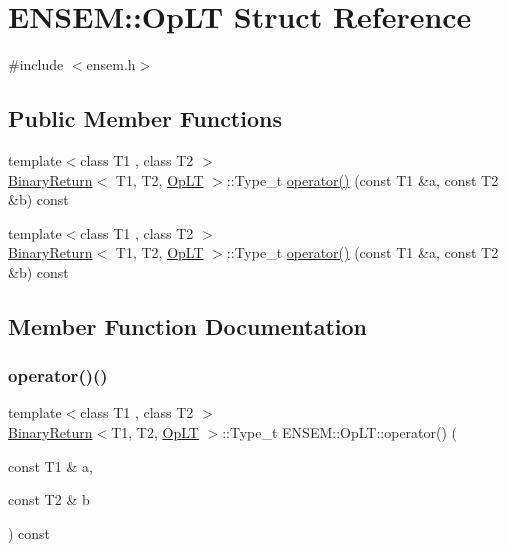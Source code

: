 \hypertarget{structENSEM_1_1OpLT}{}\section{E\+N\+S\+EM\+:\+:Op\+LT Struct Reference}
\label{structENSEM_1_1OpLT}


{\ttfamily \#include $<$ensem.\+h$>$}

\subsection*{Public Member Functions}
\begin{DoxyCompactItemize}
\item 
{\footnotesize template$<$class T1 , class T2 $>$ }\\\mbox{\hyperlink{structENSEM_1_1BinaryReturn}{Binary\+Return}}$<$ T1, T2, \mbox{\hyperlink{structENSEM_1_1OpLT}{Op\+LT}} $>$\+::Type\+\_\+t \mbox{\hyperlink{structENSEM_1_1OpLT_af52d16f9a101e3c95c415857a2da4425}{operator()}} (const T1 \&a, const T2 \&b) const
\item 
{\footnotesize template$<$class T1 , class T2 $>$ }\\\mbox{\hyperlink{structENSEM_1_1BinaryReturn}{Binary\+Return}}$<$ T1, T2, \mbox{\hyperlink{structENSEM_1_1OpLT}{Op\+LT}} $>$\+::Type\+\_\+t \mbox{\hyperlink{structENSEM_1_1OpLT_af52d16f9a101e3c95c415857a2da4425}{operator()}} (const T1 \&a, const T2 \&b) const
\end{DoxyCompactItemize}


\subsection{Member Function Documentation}
\mbox{\label{structENSEM_1_1OpLT_af52d16f9a101e3c95c415857a2da4425}} 
\subsubsection{\texorpdfstring{operator()()}{operator()()}\hspace{0.1cm}{\footnotesize\ttfamily [1/2]}}
{\footnotesize\ttfamily template$<$class T1 , class T2 $>$ \\
\mbox{\hyperlink{structENSEM_1_1BinaryReturn}{Binary\+Return}}$<$T1, T2, \mbox{\hyperlink{structENSEM_1_1OpLT}{Op\+LT}} $>$\+::Type\+\_\+t E\+N\+S\+E\+M\+::\+Op\+L\+T\+::operator() (\begin{DoxyParamCaption}\item[{const T1 \&}]{a,  }\item[{const T2 \&}]{b }\end{DoxyParamCaption}) const\hspace{0.3cm}{\ttfamily [inline]}}

